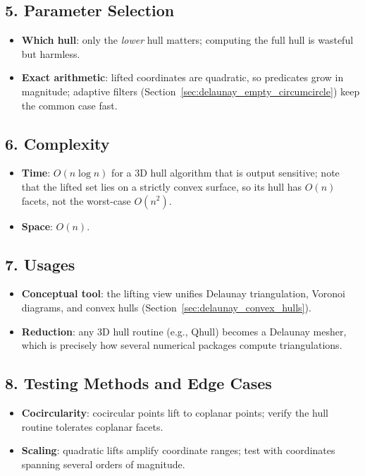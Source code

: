 \subsection{5. Parameter Selection}

\begin{itemize}
\item \textbf{Which hull}: only the \emph{lower} hull matters; computing the
  full hull is wasteful but harmless.
\item \textbf{Exact arithmetic}: lifted coordinates are quadratic, so predicates
  grow in magnitude; adaptive filters (Section~\ref{sec:delaunay_empty_circumcircle})
  keep the common case fast.
\end{itemize}

\subsection{6. Complexity}

\begin{itemize}
\item \textbf{Time}: $O(n \log n)$ for a 3D hull algorithm that is output
  sensitive; note that the lifted set lies on a strictly convex surface, so its
  hull has $O(n)$ facets, not the worst-case $O(n^2)$.
\item \textbf{Space}: $O(n)$.
\end{itemize}

\subsection{7. Usages}

\begin{itemize}
\item \textbf{Conceptual tool}: the lifting view unifies Delaunay triangulation,
  Voronoi diagrams, and convex hulls (Section~\ref{sec:delaunay_convex_hulls}).
\item \textbf{Reduction}: any 3D hull routine (e.g., Qhull) becomes a Delaunay
  mesher, which is precisely how several numerical packages compute
  triangulations.
\end{itemize}

\subsection{8. Testing Methods and Edge Cases}

\begin{itemize}
\item \textbf{Cocircularity}: cocircular points lift to coplanar points;
  verify the hull routine tolerates coplanar facets.
\item \textbf{Scaling}: quadratic lifts amplify coordinate ranges; test with
  coordinates spanning several orders of magnitude.
\end{itemize}

